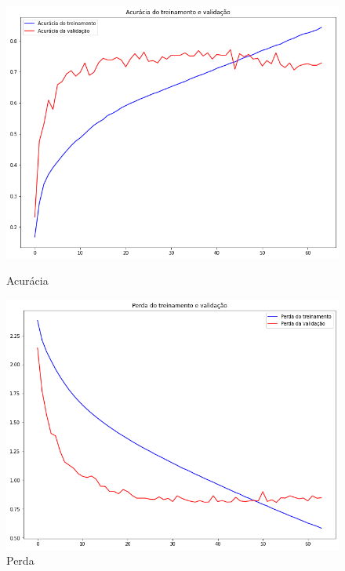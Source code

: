 \documentclass[12pt]{article}
\begin{document}
\begin{figure}[!htb]
  \begin{minipage}{.47\textwidth}
    \centering
    \includegraphics[width=1.1\linewidth]{experiments/lenet5_aug_64/accuracy.png}
    \caption{Acurácia}\label{fig:experiment_lenet5_aug_64_accuracy}
  \end{minipage}\hfill
  \begin{minipage}{.47\textwidth}
    \centering
    \includegraphics[width=1.1\linewidth]{experiments/lenet5_aug_64/loss.png}
    \caption{Perda}\label{fig:experiment_lenet5_aug_64_loss}
  \end{minipage}
\end{figure}
\end{document}
